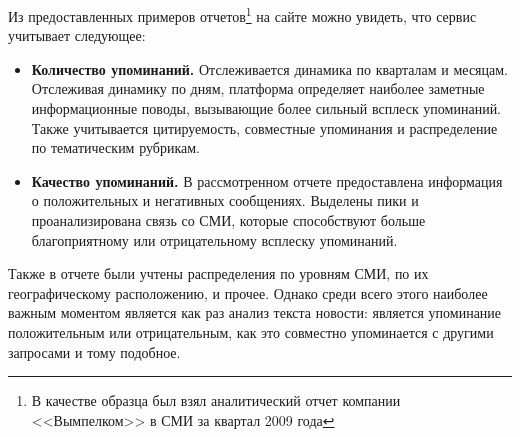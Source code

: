 Из предоставленных примеров отчетов\footnote{В качестве образца был взял аналитический отчет компании <<Вымпелком>> в СМИ за  квартал 2009 года} на сайте можно увидеть, что сервис учитывает следующее:

\begin{itemize}

\item \textbf{Количество упоминаний.} Отслеживается динамика по кварталам и месяцам. Отслеживая динамику по дням, платформа определяет наиболее заметные информационные поводы, вызывающие более сильный всплеск упоминаний. Также учитывается цитируемость, совместные упоминания и распределение по тематическим рубрикам.

\item \textbf{Качество упоминаний.} В рассмотренном отчете предоставлена информация о положительных и негативных сообщениях. Выделены пики и проанализирована связь со СМИ, которые способствуют больше благоприятному или отрицательному всплеску упоминаний.

\end{itemize}

Также в отчете были учтены распределения по уровням СМИ, по их географическому расположению, и прочее. Однако среди всего этого наиболее важным моментом является как раз анализ текста новости: является упоминание положительным или отрицательным, как это совместно упоминается с другими запросами и тому подобное.